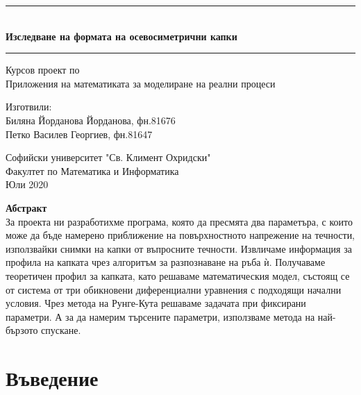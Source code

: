 \documentclass{article}
\newcommand{\HRule}[1]{\rule{\linewidth}{#1}}
\begin{document}
\pagestyle{fancy}
\fancyhf{}
\setlength\headheight{30pt}
\fancyfoot[R]{\thepage}

\begin{titlepage}
    \begin{center}
    \fontsize {50pt}{50pt}
    \HRule{1pt} \\ [1.0cm]
        \textbf{Изследване на формата на осевосиметрични капки}
        \\ [1cm]
    \HRule{1pt}
        \vspace{1cm}
        
        \Huge
        Курсов проект по \\ Приложения на математиката за моделиране на реални процеси\\
        \vspace{3cm}
        
        \Large
        Изготвили:\\ Биляна Йорданова Йорданова, фн.81676\\
        Петко Василев Георгиев, фн.81647
        
        \vfill
        \vspace{1cm}
        Софийски университет "Св. Климент Охридски"\\
        Факултет по Математика и Информатика\\
        
        Юли 2020
    \end{center}
\end{titlepage}

\tableofcontents
\newpage
\textbf{Абстракт}\\
\hspace*{3ex}За проекта ни разработихме програма, която да пресмята два параметъра, с които може да бъде намерено приближение на повърхностното напрежение на течности, използвайки снимки на капки от въпросните течности. Извличаме информация за профила на капката чрез алгоритъм за разпознаване на ръба ѝ.
Получаваме теоретичен профил за капката, като решаваме математическия модел, състоящ се от система от три обикновени диференциални уравнения с подходящи начални условия. Чрез метода на Рунге-Кута решаваме задачата при фиксирани параметри. А за да намерим търсените параметри, използваме метода на най-бързото спускане.

\section{Въведение}
\end{document}

